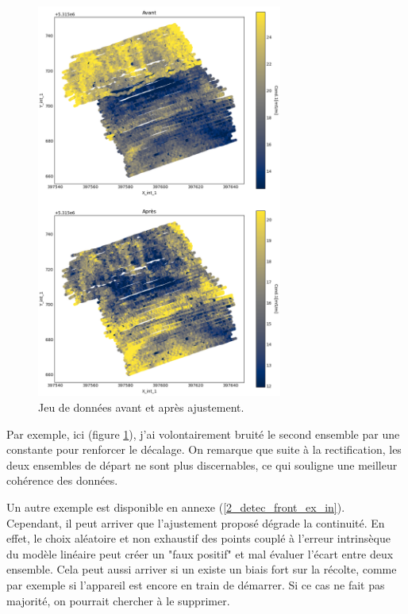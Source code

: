 \documentclass[12pt]{article}
\begin{document}
    \begin{figure}[ht!]
        \begin{center}
            \includegraphics[width=0.72\textwidth]{Images/Frontiere_ajust1-3.png}
            \caption{\label{2_avant_apres}Jeu de données avant et après ajustement.}
        \end{center}
    \end{figure}

    Par exemple, ici (figure \ref{2_avant_apres}), j'ai volontairement bruité le second ensemble par une constante pour renforcer le décalage. On remarque que suite à la rectification, les deux ensembles de départ ne sont plus discernables, ce qui souligne une meilleur cohérence des données.
    
    \label{2_detec_front_ex_out} Un autre exemple est disponible en annexe (\ref{2_detec_front_ex_in}).\\

    Cependant, il peut arriver que l'ajustement proposé dégrade la continuité. En effet, le choix aléatoire et non exhaustif des points couplé à l'erreur intrinsèque du modèle linéaire peut créer un "faux positif" et mal évaluer l'écart entre deux ensemble. Cela peut aussi arriver si un existe un biais fort sur la récolte, comme par exemple si l'appareil est encore en train de démarrer. Si ce cas ne fait pas majorité, on pourrait chercher à le supprimer.
    
\end{document}
